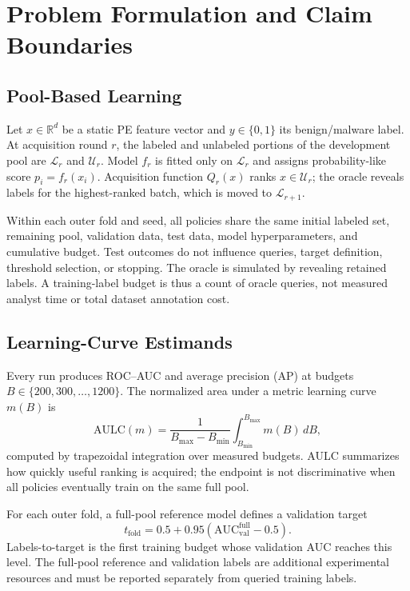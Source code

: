 \section{Problem Formulation and Claim Boundaries}
\label{sec:problem}

\subsection{Pool-Based Learning}

Let $x\in\mathbb{R}^{d}$ be a static PE feature vector and
$y\in\{0,1\}$ its benign/malware label. At acquisition round $r$, the labeled
and unlabeled portions of the development pool are $\mathcal{L}_r$ and
$\mathcal{U}_r$. Model $f_r$ is fitted only on $\mathcal{L}_r$ and assigns
probability-like score $p_i=f_r(x_i)$. Acquisition function $Q_r(x)$ ranks
$x\in\mathcal{U}_r$; the oracle reveals labels for the highest-ranked batch,
which is moved to $\mathcal{L}_{r+1}$.

Within each outer fold and seed, all policies share the same initial labeled set,
remaining pool, validation data, test data, model hyperparameters, and cumulative
budget. Test outcomes do not influence queries, target definition, threshold
selection, or stopping. The oracle is simulated by revealing retained labels. A
training-label budget is thus a count of oracle queries, not measured analyst
time or total dataset annotation cost.

\subsection{Learning-Curve Estimands}

Every run produces ROC--AUC and average precision (AP) at budgets
$B\in\{200,300,\ldots,1200\}$. The normalized area under a metric learning curve
$m(B)$ is
\begin{equation}
\mathrm{AULC}(m)=\frac{1}{B_{\max}-B_{\min}}
\int_{B_{\min}}^{B_{\max}}m(B)\,dB,
\label{eq:aulc}
\end{equation}
computed by trapezoidal integration over measured budgets. AULC summarizes how
quickly useful ranking is acquired; the endpoint is not discriminative when all
policies eventually train on the same full pool.

For each outer fold, a full-pool reference model defines a validation target
\begin{equation}
t_{\mathrm{fold}}=0.5+0.95\left(
\mathrm{AUC}^{\mathrm{full}}_{\mathrm{val}}-0.5\right).
\label{eq:target}
\end{equation}
Labels-to-target is the first training budget whose validation AUC reaches this
level. The full-pool reference and validation labels are additional experimental
resources and must be reported separately from queried training labels.

